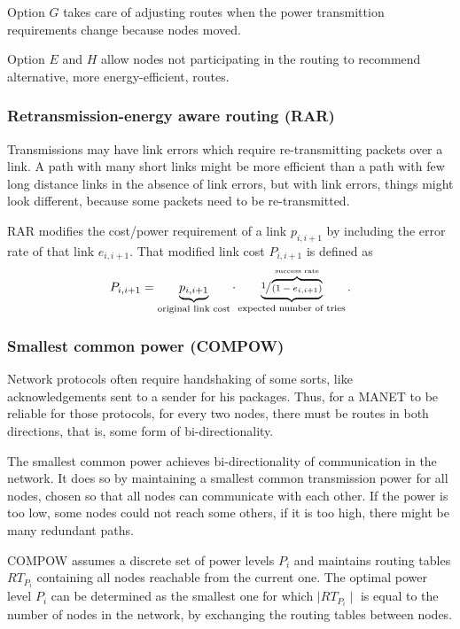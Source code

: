 \documentclass[conference]{IEEEtran}
\begin{document}
Option $G$ takes care of adjusting routes when the power transmittion requirements
change because nodes moved.

Option $E$ and $H$ allow nodes not participating in the routing to recommend
alternative, more energy-efficient, routes.

\subsubsection{Retransmission-energy aware routing (RAR)}
Transmissions may have link errors which require re-transmitting packets over
a link. A path with many short links might be more efficient than a path with
few long distance links in the absence of link errors, but with link errors,
things might look different, because some packets need to be re-transmitted.

RAR\cite{banerjee2002minimum} modifies the cost/power requirement of a link $p_{i,i+1}$ by including the error rate of that
link $e_{i,i+1}$. That modified link cost $P_{i,i+1}$ is defined as
\[ P_{i,i+1} = \underbrace{p_{i,i+1}}_{\text{original link cost}} \cdot \underbrace{\sfrac{1}{\overbrace{(1-e_{i,i+1})}^{\text{success rate}}}}_{\text{expected number of tries}}. \]

\subsubsection{Smallest common power (COMPOW)}
Network protocols often require handshaking of some sorts, like acknowledgements
sent to a sender for his packages. Thus, for a MANET to be reliable for those
protocols, for every two nodes, there must be routes in both directions, that
is, some form of bi-directionality.

The smallest common power\cite{narayanaswamy2002power} achieves bi-directionality
of communication in the network.
It does so by maintaining a smallest common transmission power for all nodes,
chosen so that all nodes can communicate with each other. If the power is too
low, some nodes could not reach some others, if it is too high, there might be
many redundant paths.

COMPOW assumes a discrete set of power levels $P_{i}$ and maintains routing
tables ${RT}_{P_{i}}$ containing all nodes reachable from the current one. The
optimal power level $P_{i}$ can be determined as the smallest one for which
$\mid RT_{P_{i}} \mid$ is equal to the number of nodes in the network, by
exchanging the routing tables between nodes.
\end{document}
